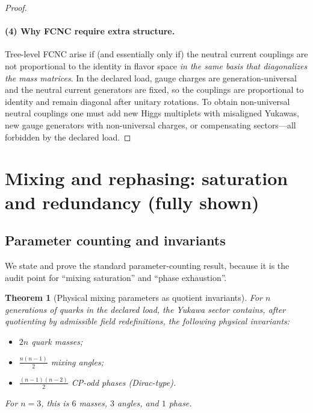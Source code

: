 \documentclass[11pt]{article}
\newtheorem{theorem}[definition]{Theorem}
\theoremstyle{remark}
\begin{document}
\begin{proof}
\paragraph{(4) Why FCNC require extra structure.}
Tree-level FCNC arise if (and essentially only if) the neutral current couplings are not proportional to
the identity in flavor space \emph{in the same basis that diagonalizes the mass matrices}. In the declared
load, gauge charges are generation-universal and the neutral current generators are fixed, so the couplings
are proportional to identity and remain diagonal after unitary rotations.
To obtain non-universal neutral couplings one must add new Higgs multiplets with misaligned Yukawas,
new gauge generators with non-universal charges, or compensating sectors---all forbidden by the declared load.
\end{proof}

\section{Mixing and rephasing: saturation and redundancy (fully shown)}

\subsection{Parameter counting and invariants}
We state and prove the standard parameter-counting result, because it is the audit point for
``mixing saturation'' and ``phase exhaustion''.

\begin{theorem}[Physical mixing parameters as quotient invariants]\label{thm:mixing-count}
For $n$ generations of quarks in the declared load, the Yukawa sector contains, after quotienting by
admissible field redefinitions, the following physical invariants:
\begin{itemize}[leftmargin=2.2em]
\item $2n$ quark masses;
\item $\frac{n(n-1)}{2}$ mixing angles;
\item $\frac{(n-1)(n-2)}{2}$ CP-odd phases (Dirac-type).
\end{itemize}
For $n=3$, this is $6$ masses, $3$ angles, and $1$ phase.
\end{theorem}
\end{document}
